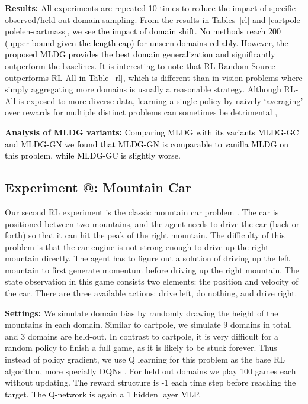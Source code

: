 \documentclass[letterpaper]{article} \usepackage{aaai18}  \usepackage{times}  \usepackage{helvet}  \usepackage{courier}  \usepackage{url}  \usepackage{graphicx}  \usepackage{amsmath}
\makeatletter
\newcommand*{\rom}[1]{\expandafter\@slowromancap\romannumeral #1@}
\newcommand{\keypoint}[1]{\vspace{0.1cm}\noindent\textbf{#1}\quad}
\makeatother
\begin{document}
{\keypoint{Results:} All experiments are repeated 10 times to reduce the impact of specific observed/held-out domain sampling. From the results in Tables~\ref{rl} and \ref{cartpole-polelen-cartmass}, \textcolor{black}{we  see the impact of domain shift. No methods reach $200$ (upper bound given the length cap) for  unseen domains reliably. However, the proposed MLDG provides the best domain generalization} and  significantly outperform the baselines. It is interesting to note that RL-Random-Source outperforms RL-All \textcolor{black}{in Table~\ref{rl}}, which is different than in vision problems where simply aggregating more domains is usually a reasonable strategy. Although RL-All is exposed to more diverse data, learning a single policy by naively `averaging' over rewards for multiple distinct problems can sometimes be detrimental \cite{yang2017metacritic}, 

\keypoint{Analysis of MLDG variants:} \textcolor{black}{Comparing MLDG with its variants MLDG-GC and MLDG-GN we found that MLDG-GN is comparable to vanilla MLDG on this problem, while MLDG-GC is slightly worse. }

\subsection{Experiment \rom{4}: Mountain Car}

Our second RL experiment is the classic mountain car problem \cite{openaigym}. The car is positioned between two mountains, and the agent needs to drive the car (back or forth) so that it can hit the peak of the right mountain. The difficulty of this problem is that the car engine is not strong enough to drive up the right mountain directly. The agent has to figure out a solution of driving up the left mountain to first generate momentum before driving up the right mountain. The state observation in this game consists two elements: the position and velocity of the car. There are three available actions: drive left, do nothing, and drive right.

\keypoint{Settings:} We simulate domain bias by randomly drawing the height of the mountains in each domain. Similar to cartpole, we simulate 9 domains in total, and 3 domains are held-out. 
In contrast to cartpole, it is very difficult for a random policy to finish a full game, as it is likely to be stuck forever. Thus instead of policy gradient, we use Q learning \cite{qlearningwatkins1992} for this problem as the base RL algorithm, more specially DQNs \cite{mnih2015dqn}. For held out domains we play 100 games each {without updating}. \textcolor{black}{The reward structure is -1 each time step before reaching the target.} \textcolor{black}{The Q-network is again a 1 hidden layer MLP.} 

}
\end{document}
